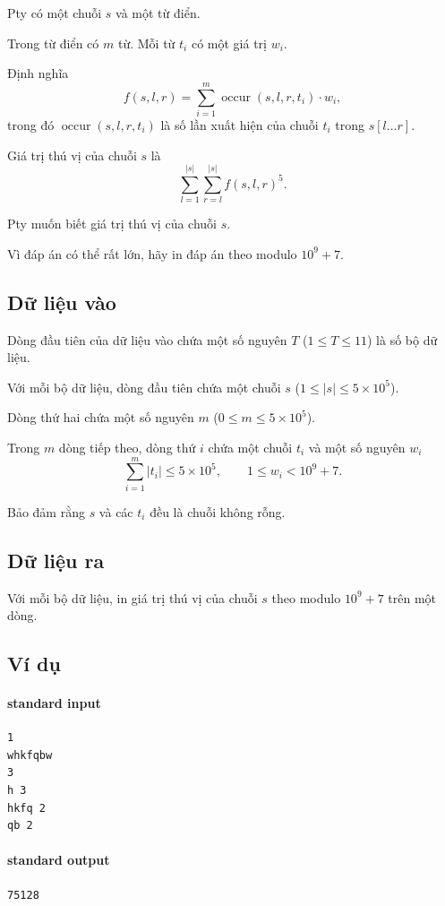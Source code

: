 \documentclass[11pt]{article}
\begin{document}
Pty có một chuỗi \(s\) và một từ điển.

Trong từ điển có \(m\) từ. Mỗi từ \(t_i\) có một giá trị \(w_i\).

Định nghĩa
\[
  f(s,l,r)=\sum_{i=1}^{m} \operatorname{occur}(s,l,r,t_i)\cdot w_i,
\]
trong đó \(\operatorname{occur}(s,l,r,t_i)\) là số lần xuất hiện của chuỗi
\(t_i\) trong \(s[l\ldots r]\).

Giá trị thú vị của chuỗi \(s\) là
\[
  \sum_{l=1}^{|s|}\sum_{r=l}^{|s|} f(s,l,r)^5.
\]

Pty muốn biết giá trị thú vị của chuỗi \(s\).

Vì đáp án có thể rất lớn, hãy in đáp án theo modulo \(10^9+7\).

\subsection*{Dữ liệu vào}

Dòng đầu tiên của dữ liệu vào chứa một số nguyên \(T\) (\(1\le T\le 11\)) là
số bộ dữ liệu.

Với mỗi bộ dữ liệu, dòng đầu tiên chứa một chuỗi \(s\)
(\(1\le |s|\le 5\times 10^5\)).

Dòng thứ hai chứa một số nguyên \(m\) (\(0\le m\le 5\times 10^5\)).

Trong \(m\) dòng tiếp theo, dòng thứ \(i\) chứa một chuỗi \(t_i\) và một số
nguyên \(w_i\)
\[
  \sum_{i=1}^{m}|t_i|\le 5\times 10^5,\qquad 1\le w_i<10^9+7.
\]

Bảo đảm rằng \(s\) và các \(t_i\) đều là chuỗi không rỗng.

\subsection*{Dữ liệu ra}

Với mỗi bộ dữ liệu, in giá trị thú vị của chuỗi \(s\) theo modulo \(10^9+7\)
trên một dòng.

\subsection*{Ví dụ}

\paragraph{standard input}
\begin{verbatim}
1
whkfqbw
3
h 3
hkfq 2
qb 2
\end{verbatim}

\paragraph{standard output}
\begin{verbatim}
75128
\end{verbatim}
\end{document}
